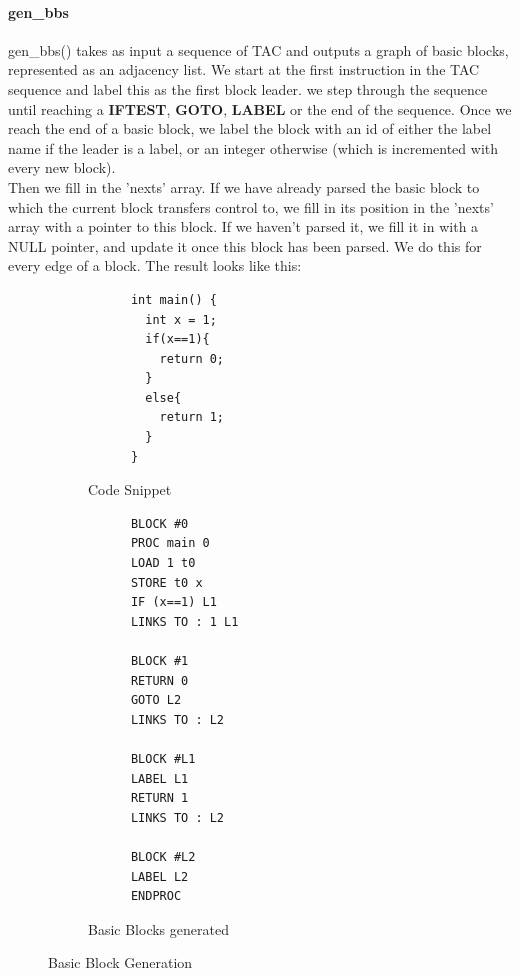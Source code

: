 \documentclass[12pt]{article}
\begin{document}
\paragraph{gen\_bbs} gen\_bbs() takes as input a sequence of TAC and outputs a graph of basic blocks, represented as an adjacency list. We start at the first instruction in the TAC sequence and label this as the first block leader. we step through the sequence until reaching a \textbf{IFTEST}, \textbf{GOTO}, \textbf{LABEL} or the end of the sequence.
Once we reach the end of a basic block, we label the block with an id of either the label name if the leader is a label, or an integer otherwise (which is incremented with every new block). \\\newline Then we fill in the 'nexts' array. If we have already parsed the basic block to which the current block transfers control to, we fill in its position in the 'nexts' array with a pointer to this block. If we haven't parsed it, we fill it in with a NULL pointer, and update it once this block has been parsed. We do this for every edge of a block. The result looks like this: 
\begin{figure}[H]
  \centering
  \begin{subfigure}{.5\textwidth}
    \centering
    \begin{verbatim}
      int main() {
        int x = 1;
        if(x==1){
          return 0;
        } 
        else{
          return 1;
        }
      }
    \end{verbatim}
    \caption{Code Snippet}
    \label{code2}
  \end{subfigure}%
  \begin{subfigure}{.5\textwidth}
    \centering
    \begin{verbatim}
      BLOCK #0
      PROC main 0
      LOAD 1 t0
      STORE t0 x
      IF (x==1) L1
      LINKS TO : 1 L1
      
      BLOCK #1
      RETURN 0
      GOTO L2
      LINKS TO : L2
      
      BLOCK #L1
      LABEL L1
      RETURN 1
      LINKS TO : L2
      
      BLOCK #L2
      LABEL L2
      ENDPROC
    \end{verbatim}
    \caption{Basic Blocks generated}
    \label{bbgen}
  \end{subfigure}
  \caption{Basic Block Generation}
  \label{bbdemo}
  \end{figure}
\end{document}
